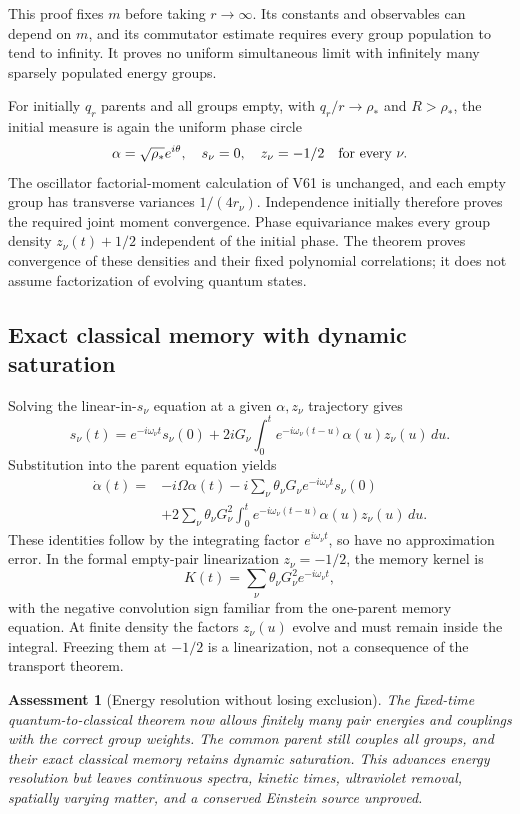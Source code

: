 \documentclass[11pt]{article}
\newtheorem{assessment}[theorem]{Assessment}
\theoremstyle{remark}
\begin{document}
This proof fixes \(m\) before taking \(r\to\infty\).
Its constants and observables can depend on \(m\),
and its commutator estimate requires every group
population to tend to infinity.  It proves no uniform
simultaneous limit with infinitely many sparsely
populated energy groups.

For initially \(q_r\) parents and all groups empty,
with \(q_r/r\to\rho_*\) and \(R>\rho_*\), the initial
measure is again the uniform phase circle
\[
 \alpha=\sqrt{\rho_*}e^{i\theta},\quad
 s_\nu=0,\quad z_\nu=-1/2\quad\hbox{for every }\nu.
\]
The oscillator factorial-moment calculation of V61
is unchanged, and each empty group has transverse
variances \(1/(4r_\nu)\).  Independence initially
therefore proves the required joint moment convergence.
Phase equivariance makes every group density
\(z_\nu(t)+1/2\) independent of the initial phase.
The theorem proves convergence of these densities
and their fixed polynomial correlations; it does
not assume factorization of evolving quantum states.

\subsection{Exact classical memory with dynamic saturation}

Solving the linear-in-\(s_\nu\) equation at a given
\(\alpha,z_\nu\) trajectory gives
\[
 s_\nu(t)=e^{-i\omega_\nu t}s_\nu(0)
       +2iG_\nu\int_0^t e^{-i\omega_\nu(t-u)}
                                  \alpha(u)z_\nu(u)\,du.
\]
Substitution into the parent equation yields
\[
 \begin{split}
 \dot\alpha(t)={}&-i\Omega\alpha(t)
       -i\sum_\nu\theta_\nu G_\nu
                         e^{-i\omega_\nu t}s_\nu(0)\\
 &+2\sum_\nu\theta_\nu G_\nu^2
       \int_0^t e^{-i\omega_\nu(t-u)}
                                  \alpha(u)z_\nu(u)\,du .
 \end{split}
\]
These identities follow by the integrating factor
\(e^{i\omega_\nu t}\), so have no approximation error.
In the formal empty-pair linearization \(z_\nu=-1/2\),
the memory kernel is
\[
 K(t)=\sum_\nu\theta_\nu G_\nu^2e^{-i\omega_\nu t},
\]
with the negative convolution sign familiar from the
one-parent memory equation.  At finite density the
factors \(z_\nu(u)\) evolve and must remain inside the
integral.  Freezing them at \(-1/2\) is a linearization,
not a consequence of the transport theorem.

\begin{assessment}[Energy resolution without losing exclusion]
\label{ass:v20v62}
The fixed-time quantum-to-classical theorem now allows
finitely many pair energies and couplings with the
correct group weights.  The common parent still couples
all groups, and their exact classical memory retains
dynamic saturation.  This advances energy resolution
but leaves continuous spectra, kinetic times, ultraviolet
removal, spatially varying matter, and a conserved
Einstein source unproved.
\end{assessment}
\end{document}
